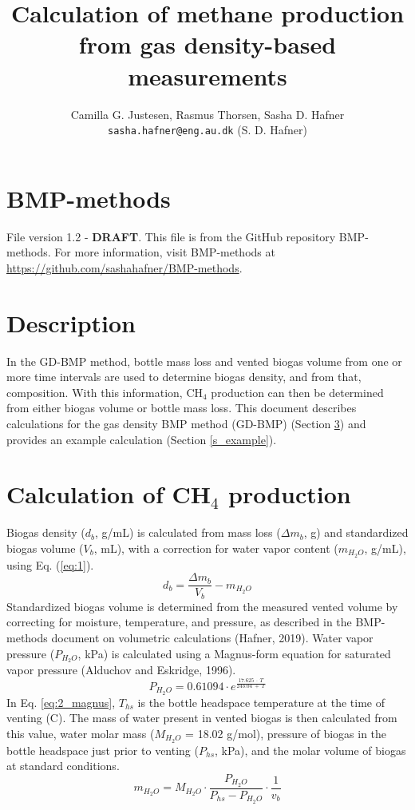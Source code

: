 \documentclass[]{article}
\title {Calculation of methane production from gas density-based measurements}
\author{Camilla G. Justesen, Rasmus Thorsen, Sasha D. Hafner
\\
\texttt{sasha.hafner@eng.au.dk} (S. D. Hafner)\\
}
\begin{document}
\maketitle

\section{BMP-methods}
File version 1.2 - \textbf{DRAFT}. 
This file is from the GitHub repository BMP-methods.
For more information, visit BMP-methods at \url{https://github.com/sashahafner/BMP-methods}.

\section{Description}
In the GD-BMP method, bottle mass loss and vented biogas volume from one or more time intervals are used to determine biogas density, and from that, composition. 
With this information, CH$_4$ production can then be determined from either biogas volume or bottle mass loss.
This document describes calculations for the gas density BMP method (GD-BMP) (Section \ref{s_equations}) and provides an example calculation (Section \ref{s_example}).

\section{Calculation of CH$_4$ production} \label{s_equations}
Biogas density ($d_b$, g/mL) is calculated from  mass loss ($\Delta m_b$, g) and standardized biogas volume ($V_b$, mL), with a correction for water vapor content ($m_{H_2O}$, g/mL), using Eq. (\ref{eq:1}). 
\begin{equation}
  \label{eq:1}
  d_b=\frac{\Delta m_b}{V_b}-m_{H_2O}
\end{equation}
Standardized biogas volume is determined from the measured vented volume by correcting for moisture, temperature, and pressure, as described in the BMP-methods document on volumetric calculations (Hafner, 2019).
Water vapor pressure ($P_{H_2O}$, kPa) is calculated using a Magnus-form equation for saturated vapor pressure (Alduchov and Eskridge, 1996).
\begin{equation}
\label{eq:2_magnus}
   P_{H_2O} = 0.61094 \cdot e^{\frac{17.625\ \cdot \ T}{243.04\ + \ T}}
\end{equation}
In Eq. \ref{eq:2_magnus}, $T_{hs}$ is the bottle headspace temperature at the time of venting (\degree C). 
The mass of water present in vented biogas is then calculated from this value, water molar mass ($M_{H_2O}$ = 18.02 g/mol), pressure of biogas in the bottle headspace just prior to venting ($P_{hs}$, kPa), and the molar volume of biogas at standard conditions.
\begin{equation}
  \label{eq:3}
  m_{H_2O}=M_{H_2O} \cdot \frac{P_{H_2O}}{P_{hs}-P_{H_2O}} \cdot \frac{1}{v_b}
\end{equation}
\end{document}
